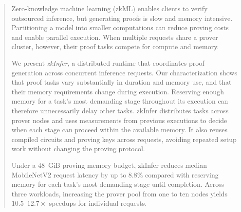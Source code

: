 \providecommand{\zkTBC}[1]{\textbf{[TO COMPLETE: #1]}}

\begin{abstract}
Zero-knowledge machine learning (zkML) enables clients to verify outsourced inference, but generating proofs is slow and memory intensive. Partitioning a model into smaller computations can reduce proving costs and enable parallel execution. When multiple requests share a prover cluster, however, their proof tasks compete for compute and memory.

We present \emph{zkInfer}, a distributed runtime that coordinates proof generation across concurrent inference requests. Our characterization shows that proof tasks vary substantially in duration and memory use, and that their memory requirements change during execution. Reserving enough memory for a task's most demanding stage throughout its execution can therefore unnecessarily delay other tasks. zkInfer distributes tasks across prover nodes and uses measurements from previous executions to decide when each stage can proceed within the available memory. It also reuses compiled circuits and proving keys across requests, avoiding repeated setup work without changing the proving protocol.

Under a 48~GiB proving memory budget, zkInfer reduces median MobileNetV2 request latency by up to 8.8\% compared with reserving memory for each task's most demanding stage until completion. Across three workloads, increasing the prover pool from one to ten nodes yields \(10.5\)--\(12.7\times\) speedups for individual requests.
\end{abstract}
